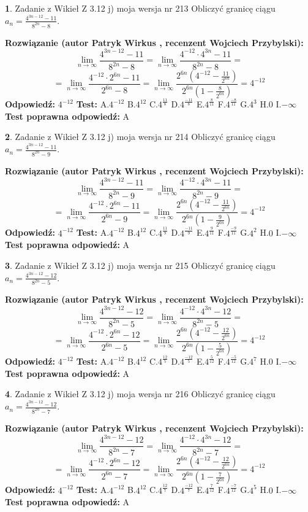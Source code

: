 \documentclass[12pt, a4paper]{article}
\theoremstyle{definition} %
\newtheorem{zad}{}
\newcommand{\zadStart}[1]{\begin{zad}#1\newline}
\newcommand{\zadStop}{\end{zad}}
\newcommand{\rozwStart}[2]{\noindent \textbf{Rozwiązanie (autor #1 , recenzent #2): }\newline}
\newcommand{\rozwStop}{\newline}
\newcommand{\odpStart}{\noindent \textbf{Odpowiedź:}\newline}
\newcommand{\odpStop}{\newline}
\newcommand{\testStart}{\noindent \textbf{Test:}\newline}
\newcommand{\testStop}{\newline}
\newcommand{\kluczStart}{\noindent \textbf{Test poprawna odpowiedź:}\newline}
\newcommand{\kluczStop}{\newline}
\begin{document}
\zadStart{Zadanie z Wikieł Z 3.12 j) moja wersja nr 213}
Obliczyć granicę ciągu $a_{n}=\frac{4^{3n-12}-11}{8^{2n}-8}$.
\zadStop
\rozwStart{Patryk Wirkus}{Wojciech Przybylski}
$$\lim\limits_{n\to\infty}\frac{4^{3n-12}-11}{8^{2n}-8}= \lim\limits_{n\to\infty}\frac{4^{-12} \cdot 4^{3n}-11}{8^{2n}-8}=$$
$$= \lim\limits_{n\to\infty}\frac{4^{-12} \cdot 2^{6n}-11}{2^{6n}-8}= \lim\limits_{n\to\infty}\frac{2^{6n}(4^{-12} - \frac{11}{2^{6n}})}{2^{6n}(1-\frac{8}{2^{6n}})}= 4^{-12}$$
\rozwStop
\odpStart
$4^{-12}$
\odpStop
\testStart
A.$4^{-12}$
B.$4^{12}$
C.$4^{\frac{11}{8}}$
D.$4^{\frac{-11}{8}}$
E.$4^{\frac{8}{11}}$
F.$4^{\frac{-8}{11}}$
G.$4^{3}$
H.$0$
I.$-\infty$
\testStop
\kluczStart
A
\kluczStop



\zadStart{Zadanie z Wikieł Z 3.12 j) moja wersja nr 214}
Obliczyć granicę ciągu $a_{n}=\frac{4^{3n-12}-11}{8^{2n}-9}$.
\zadStop
\rozwStart{Patryk Wirkus}{Wojciech Przybylski}
$$\lim\limits_{n\to\infty}\frac{4^{3n-12}-11}{8^{2n}-9}= \lim\limits_{n\to\infty}\frac{4^{-12} \cdot 4^{3n}-11}{8^{2n}-9}=$$
$$= \lim\limits_{n\to\infty}\frac{4^{-12} \cdot 2^{6n}-11}{2^{6n}-9}= \lim\limits_{n\to\infty}\frac{2^{6n}(4^{-12} - \frac{11}{2^{6n}})}{2^{6n}(1-\frac{9}{2^{6n}})}= 4^{-12}$$
\rozwStop
\odpStart
$4^{-12}$
\odpStop
\testStart
A.$4^{-12}$
B.$4^{12}$
C.$4^{\frac{11}{9}}$
D.$4^{\frac{-11}{9}}$
E.$4^{\frac{9}{11}}$
F.$4^{\frac{-9}{11}}$
G.$4^{2}$
H.$0$
I.$-\infty$
\testStop
\kluczStart
A
\kluczStop



\zadStart{Zadanie z Wikieł Z 3.12 j) moja wersja nr 215}
Obliczyć granicę ciągu $a_{n}=\frac{4^{3n-12}-12}{8^{2n}-5}$.
\zadStop
\rozwStart{Patryk Wirkus}{Wojciech Przybylski}
$$\lim\limits_{n\to\infty}\frac{4^{3n-12}-12}{8^{2n}-5}= \lim\limits_{n\to\infty}\frac{4^{-12} \cdot 4^{3n}-12}{8^{2n}-5}=$$
$$= \lim\limits_{n\to\infty}\frac{4^{-12} \cdot 2^{6n}-12}{2^{6n}-5}= \lim\limits_{n\to\infty}\frac{2^{6n}(4^{-12} - \frac{12}{2^{6n}})}{2^{6n}(1-\frac{5}{2^{6n}})}= 4^{-12}$$
\rozwStop
\odpStart
$4^{-12}$
\odpStop
\testStart
A.$4^{-12}$
B.$4^{12}$
C.$4^{\frac{12}{5}}$
D.$4^{\frac{-12}{5}}$
E.$4^{\frac{5}{12}}$
F.$4^{\frac{-5}{12}}$
G.$4^{7}$
H.$0$
I.$-\infty$
\testStop
\kluczStart
A
\kluczStop



\zadStart{Zadanie z Wikieł Z 3.12 j) moja wersja nr 216}
Obliczyć granicę ciągu $a_{n}=\frac{4^{3n-12}-12}{8^{2n}-7}$.
\zadStop
\rozwStart{Patryk Wirkus}{Wojciech Przybylski}
$$\lim\limits_{n\to\infty}\frac{4^{3n-12}-12}{8^{2n}-7}= \lim\limits_{n\to\infty}\frac{4^{-12} \cdot 4^{3n}-12}{8^{2n}-7}=$$
$$= \lim\limits_{n\to\infty}\frac{4^{-12} \cdot 2^{6n}-12}{2^{6n}-7}= \lim\limits_{n\to\infty}\frac{2^{6n}(4^{-12} - \frac{12}{2^{6n}})}{2^{6n}(1-\frac{7}{2^{6n}})}= 4^{-12}$$
\rozwStop
\odpStart
$4^{-12}$
\odpStop
\testStart
A.$4^{-12}$
B.$4^{12}$
C.$4^{\frac{12}{7}}$
D.$4^{\frac{-12}{7}}$
E.$4^{\frac{7}{12}}$
F.$4^{\frac{-7}{12}}$
G.$4^{5}$
H.$0$
I.$-\infty$
\testStop
\kluczStart
A
\kluczStop
\end{document}
